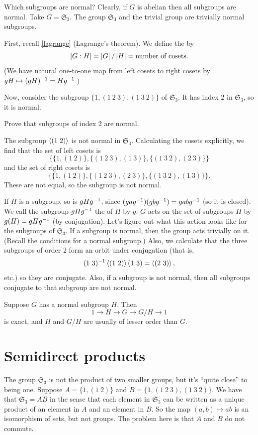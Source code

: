 \documentclass[11pt, twoside]{amsart}
\begin{document}
Which subgroups are normal? Clearly, if $G$ is abelian then all subgroups are normal. Take $G=\mathfrak{S}_3$. The group $\mathfrak{S}_3$ and the trivial group are trivially normal subgroups. 

First, recall \cref{lagrange} (Lagrange's theorem). We define the  by
$$
\left [G : H \right] = \left \lvert G \right \rvert/\left \lvert H \right \rvert = \textrm{number of cosets}.
$$
(We have natural one-to-one map from left cosets to right cosets by $gH \mapsto (gH)^{-1} = Hg^{-1}$.) 

Now, consider the subgroup $\{ 1, (1\ 2\ 3), (1\ 3\ 2)\}$ of $\mathfrak{S}_3$. It has index $2$ in $\mathfrak{S}_3$, so it is normal.
\begin{exercise}
Prove that subgroups of index $2$ are normal.
\end{exercise}
The subgroup $\left \langle (1\ 2) \right \rangle$ is not normal in $\mathfrak{S}_3$. Calculating the cosets explicitly, we find that the set of left cosets is
$$
\{ \{1, (1\ 2)\} , \{ (1\ 2\ 3), (1\ 3)\}, \{(1\ 3\ 2), (2\ 3)\}\}
$$
and the set of right cosets is
$$
\{  \{1,(1\ 2)\}, \{(1\ 2\ 3), (2\ 3) \}, \{(1\ 3\ 2) , (1\ 3) \}    \}.
$$
These are not equal, so the subgroup is not normal. 


If $H$ is a subgroup, so is $gHg^{-1}$, since $(gag^{-1})(gbg^{-1}) = gabg^{-1}$ (so it is closed). We call the subgroup $gHg^{-1}$ the  of $H$ by $g$. $G$ acts on the set of subgroups $H$ by $g(H) = gHg^{-1}$ (by conjugation). Let's figure out what this action looks like for the subgroups of $\mathfrak{S}_3$. If a subgroup is normal, then the group acts trivially on it. (Recall the conditions for a normal subgroup.) Also, we calculate that the three subgroups of order $2$ form an orbit under conjugation (that is, 
$$
(1\ 3)\inv\ang{(1\ 2)}(1\ 3) = \ang{(2\ 3)},
 $$
etc.) so they are conjugate. Also, if a subgroup is not normal, then all subgroups conjugate to that subgroup are not normal.

Suppose $G$ has a normal subgroup $H$. Then 
$$
1\longrightarrow H \longrightarrow G \longrightarrow G/H \longrightarrow 1
$$
is exact, and $H$ and $G/H$ are usually of lesser order than $G$.

\section{Semidirect products}
The group $\mathfrak{S}_3$ is not the product of two smaller groups, but it's ``quite close'' to being one. Suppose $A = \{ 1, (1\ 2)\}$ and $B = \{1, (1\ 2\ 3), (1\ 3\ 2)\}$. We have that $\mathfrak{S}_3 = AB$ in the sense that each element in $\mathfrak{S}_3$ can be written as a unique product of an element in $A$ and an element in $B$. So the map $(a,b) \mapsto ab$ is an isomorphism of sets, but not groups. The problem here is that $A$ and $B$ do not commute. 
\end{document}
